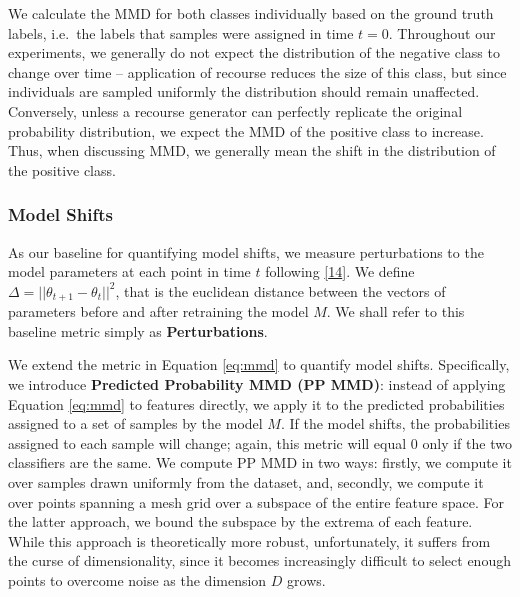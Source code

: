 \documentclass[conference,final,]{IEEEtran}
\theoremstyle{definition}
\theoremstyle{definition}
\theoremstyle{definition}
\theoremstyle{definition}
\theoremstyle{remark}
\begin{document}
We calculate the MMD for both classes individually based on the ground truth labels, i.e.~the labels that samples were assigned in time \(t=0\). Throughout our experiments, we generally do not expect the distribution of the negative class to change over time -- application of recourse reduces the size of this class, but since individuals are sampled uniformly the distribution should remain unaffected. Conversely, unless a recourse generator can perfectly replicate the original probability distribution, we expect the MMD of the positive class to increase. Thus, when discussing MMD, we generally mean the shift in the distribution of the positive class.

\hypertarget{model-shifts}{%
\subsubsection{Model Shifts}\label{model-shifts}}

As our baseline for quantifying model shifts, we measure perturbations to the model parameters at each point in time \(t\) following \protect\hyperlink{ref-upadhyay2021robust}{{[}14{]}}. We define \(\Delta=||\theta_{t+1}-\theta_{t}||^2\), that is the euclidean distance between the vectors of parameters before and after retraining the model \(M\). We shall refer to this baseline metric simply as \textbf{Perturbations}.

We extend the metric in Equation \eqref{eq:mmd} to quantify model shifts. Specifically, we introduce \textbf{Predicted Probability MMD (PP MMD)}: instead of applying Equation \eqref{eq:mmd} to features directly, we apply it to the predicted probabilities assigned to a set of samples by the model \(M\). If the model shifts, the probabilities assigned to each sample will change; again, this metric will equal 0 only if the two classifiers are the same. We compute PP MMD in two ways: firstly, we compute it over samples drawn uniformly from the dataset, and, secondly, we compute it over points spanning a mesh grid over a subspace of the entire feature space. For the latter approach, we bound the subspace by the extrema of each feature. While this approach is theoretically more robust, unfortunately, it suffers from the curse of dimensionality, since it becomes increasingly difficult to select enough points to overcome noise as the dimension \(D\) grows.
\end{document}
